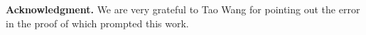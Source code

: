 \documentclass[11pt]{article}
\theoremstyle{slantthm}
\numberwithin{equation}{section}
\theoremstyle{definition}
\numberwithin{equation}{section}
\newcommand{\0}{\varnothing}
\newcommand\eve[1]{{\color{nicelavender}{#1}}}
\begin{document}

\bigskip

\noindent
\textbf{Acknowledgment.} We are very grateful to Tao Wang for pointing out the error in the proof of \cite[Theorem 1.4]{WD} which prompted this work.

%
%
\frenchspacing

\printbibliography
\end{document}

